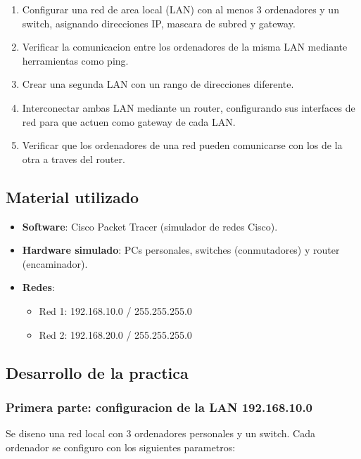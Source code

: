 \begin{enumerate}
    \item Configurar una red de area local (LAN) con al menos 3 ordenadores y un
    switch, asignando direcciones IP, mascara de subred y gateway.
    \item Verificar la comunicacion entre los ordenadores de la misma LAN
    mediante herramientas como ping.
    \item Crear una segunda LAN con un rango de direcciones diferente.
    \item Interconectar ambas LAN mediante un router, configurando sus interfaces
    de red para que actuen como gateway de cada LAN.
    \item Verificar que los ordenadores de una red pueden comunicarse con los de
    la otra a traves del router.
\end{enumerate}

\subsection{Material utilizado}

\begin{itemize}
    \item \textbf{Software}: Cisco Packet Tracer (simulador de redes Cisco).
    \item \textbf{Hardware simulado}: PCs personales, switches (conmutadores) y
    router (encaminador).
    \item \textbf{Redes}:
    \begin{itemize}
        \item Red 1: 192.168.10.0 / 255.255.255.0
        \item Red 2: 192.168.20.0 / 255.255.255.0
    \end{itemize}
\end{itemize}

\subsection{Desarrollo de la practica}

\subsubsection{Primera parte: configuracion de la LAN 192.168.10.0}

Se diseno una red local con 3 ordenadores personales y un switch. Cada
ordenador se configuro con los siguientes parametros:

